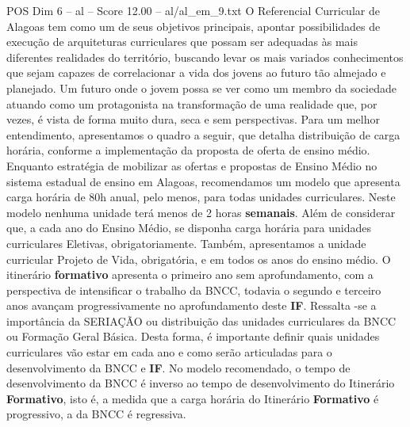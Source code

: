\begin{textsample}{POS Dim 6 – al – Score 12.00 – al/al\_em\_9.txt}
O Referencial Curricular de Alagoas tem como um de seus objetivos principais, apontar possibilidades de execução de arquiteturas curriculares que possam ser adequadas às mais diferentes realidades do território, buscando levar os mais variados conhecimentos que sejam capazes de correlacionar a vida dos jovens ao futuro tão almejado e planejado.
Um futuro onde o jovem possa se ver como um membro da sociedade atuando como um protagonista na transformação de uma realidade que, por vezes, é vista de forma muito dura, seca e sem perspectivas.
Para um melhor entendimento, apresentamos o quadro a seguir, que detalha distribuição de carga horária, conforme a implementação da proposta de oferta de ensino médio.
Enquanto estratégia de mobilizar as ofertas e propostas de Ensino Médio no sistema estadual de ensino em Alagoas, recomendamos um modelo que apresenta carga horária de 80h anual, pelo menos, para todas unidades curriculares.
Neste modelo nenhuma unidade terá menos de 2 horas \textbf{semanais}.
Além de considerar que, a cada ano do Ensino Médio, se disponha carga horária para unidades curriculares Eletivas, obrigatoriamente.
Também, apresentamos a unidade curricular Projeto de Vida, obrigatória, e em todos os anos do ensino médio.
O itinerário \textbf{formativo} apresenta o primeiro ano sem aprofundamento, com a perspectiva de intensificar o trabalho da BNCC, todavia o segundo e terceiro anos avançam progressivamente no aprofundamento deste \textbf{IF}.
Ressalta -se a importância da SERIAÇÃO ou distribuição das unidades curriculares da BNCC ou Formação Geral Básica.
Desta forma, é importante definir quais unidades curriculares vão estar em cada ano e como serão articuladas para o desenvolvimento da BNCC e \textbf{IF}.
No modelo recomendado, o tempo de desenvolvimento da BNCC é inverso ao tempo de desenvolvimento do Itinerário \textbf{Formativo}, isto é, a medida que a carga horária do Itinerário \textbf{Formativo} é progressivo, a da BNCC é regressiva.

\end{textsample}
